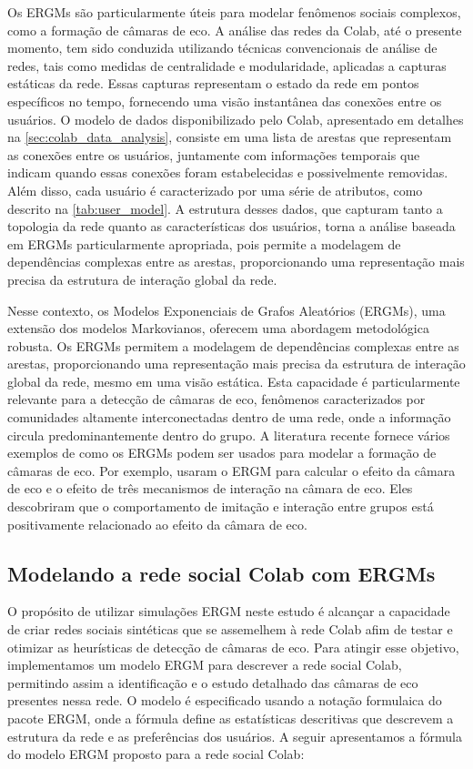 Os ERGMs são particularmente úteis para modelar fenômenos sociais complexos, como a formação de câmaras de eco. A análise das redes da Colab, até o presente momento, tem sido conduzida utilizando técnicas convencionais de análise de redes, tais como medidas de centralidade e modularidade, aplicadas a capturas estáticas da rede. Essas capturas representam o estado da rede em pontos específicos no tempo, fornecendo uma visão instantânea das conexões entre os usuários. O modelo de dados disponibilizado pelo Colab, apresentado em detalhes na \autoref{sec:colab_data_analysis}, consiste em uma lista de arestas que representam as conexões entre os usuários, juntamente com informações temporais que indicam quando essas conexões foram estabelecidas e possivelmente removidas. Além disso, cada usuário é caracterizado por uma série de atributos, como descrito na \autoref{tab:user_model}. A estrutura desses dados, que capturam tanto a topologia da rede quanto as características dos usuários, torna a análise baseada em ERGMs particularmente apropriada, pois permite a modelagem de dependências complexas entre as arestas, proporcionando uma representação mais precisa da estrutura de interação global da rede.

Nesse contexto, os Modelos Exponenciais de Grafos Aleatórios (ERGMs), uma extensão dos modelos Markovianos, oferecem uma abordagem metodológica robusta. Os ERGMs permitem a modelagem de dependências complexas entre as arestas, proporcionando uma representação mais precisa da estrutura de interação global da rede, mesmo em uma visão estática. Esta capacidade é particularmente relevante para a detecção de câmaras de eco, fenômenos caracterizados por comunidades altamente interconectadas dentro de uma rede, onde a informação circula predominantemente dentro do grupo. A literatura recente fornece vários exemplos de como os ERGMs podem ser usados para modelar a formação de câmaras de eco. Por exemplo,  usaram o ERGM para calcular o efeito da câmara de eco e o efeito de três mecanismos de interação na câmara de eco. Eles descobriram que o comportamento de imitação e interação entre grupos está positivamente relacionado ao efeito da câmara de eco.

\subsection{Modelando a rede social Colab com ERGMs}

O propósito de utilizar simulações ERGM neste estudo é alcançar a capacidade de criar redes sociais sintéticas que se assemelhem à rede Colab afim de testar e otimizar as heurísticas de detecção de câmaras de eco. Para atingir esse objetivo, implementamos um modelo ERGM para descrever a rede social Colab, permitindo assim a identificação e o estudo detalhado das câmaras de eco presentes nessa rede.  O modelo é especificado usando a notação formulaica do pacote ERGM, onde a fórmula define as estatísticas descritivas que descrevem a estrutura da rede e as preferências dos usuários. A seguir apresentamos a fórmula do modelo ERGM proposto para a rede social Colab:

